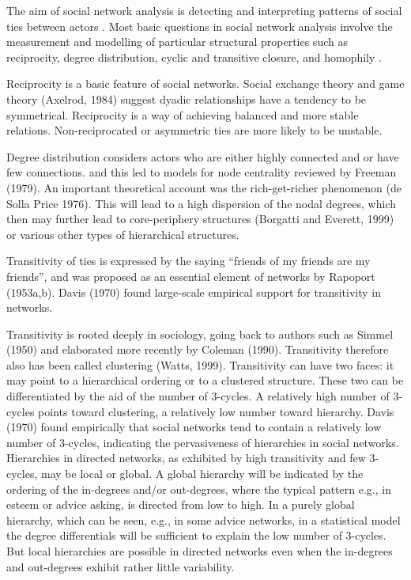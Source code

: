 The aim of social network analysis is detecting and interpreting patterns of social ties between actors \citep{wasserman1994social,de2011exploratory}. Most basic questions in social network analysis involve the measurement and modelling of particular structural properties such as reciprocity, degree distribution, cyclic and transitive closure, and homophily \citep{butts2008social,snijders2011statistical}.

Reciprocity is a basic feature of social networks. Social exchange theory \citep{emerson1976social} and game theory (Axelrod, 1984) suggest dyadic relationships have a tendency to be symmetrical. Reciprocity is a way of achieving balanced and more stable relations. Non-reciprocated or asymmetric ties are more likely to be unstable.

Degree distribution considers actors who are either highly connected and or have few connections. and this led to models for node centrality reviewed by Freeman (1979). An important theoretical account was the rich-get-richer phenomenon (de Solla Price 1976). This will lead to a high dispersion of the nodal degrees, which then may further lead to core-periphery structures (Borgatti and Everett, 1999) or various other types of hierarchical structures. 

Transitivity of ties is expressed by the saying \enquote{friends of my friends are my friends}, and was proposed as an essential element of networks by Rapoport (1953a,b). Davis (1970) found large-scale empirical support for transitivity in networks. 

Transitivity is rooted deeply in sociology, going back to authors such as Simmel (1950) and elaborated more recently by Coleman (1990). Transitivity therefore also has been called clustering (Watts, 1999). Transitivity can have two faces: it may point to a hierarchical ordering or to a clustered structure. These two can be differentiated by the aid of the number of 3-cycles. A relatively high number of 3-cycles points toward clustering, a relatively low number toward hierarchy. Davis (1970) found empirically that social networks tend to contain a relatively low number of 3-cycles, indicating the pervasiveness of hierarchies in social networks. Hierarchies in directed networks, as exhibited by high transitivity and few 3-cycles, may be local or global. A global hierarchy will be indicated by the ordering of the in-degrees and/or out-degrees, where the typical pattern e.g., in esteem or advice asking, is directed from low to high. In a purely global hierarchy, which can be seen, e.g., in some advice networks, in a statistical model the degree differentials will be sufficient to explain the low number of 3-cycles. But local hierarchies are possible in directed networks even when the in-degrees and out-degrees exhibit rather little variability.

